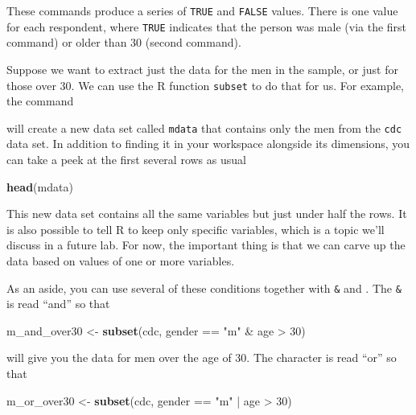 \documentclass[]{article}
\newenvironment{Shaded}{\begin{snugshade}}{\end{snugshade}}
\newcommand{\KeywordTok}[1]{\textcolor[rgb]{0.13,0.29,0.53}{\textbf{{#1}}}}
\newcommand{\DecValTok}[1]{\textcolor[rgb]{0.00,0.00,0.81}{{#1}}}
\newcommand{\StringTok}[1]{\textcolor[rgb]{0.31,0.60,0.02}{{#1}}}
\newcommand{\NormalTok}[1]{{#1}}
\begin{document}
These commands produce a series of \texttt{TRUE} and \texttt{FALSE}
values. There is one value for each respondent, where \texttt{TRUE}
indicates that the person was male (via the first command) or older than
30 (second command).

Suppose we want to extract just the data for the men in the sample, or
just for those over 30. We can use the R function \texttt{subset} to do
that for us. For example, the command

\begin{Shaded}
\end{Shaded}

will create a new data set called \texttt{mdata} that contains only the
men from the \texttt{cdc} data set. In addition to finding it in your
workspace alongside its dimensions, you can take a peek at the first
several rows as usual

\begin{Shaded}
\begin{Highlighting}[]
\KeywordTok{head}\NormalTok{(mdata)}
\end{Highlighting}
\end{Shaded}

This new data set contains all the same variables but just under half
the rows. It is also possible to tell R to keep only specific variables,
which is a topic we'll discuss in a future lab. For now, the important
thing is that we can carve up the data based on values of one or more
variables.

As an aside, you can use several of these conditions together with
\texttt{\&} and \texttt{\textbar{}}. The \texttt{\&} is read ``and'' so
that

\begin{Shaded}
\begin{Highlighting}[]
\NormalTok{m_and_over30 <-}\StringTok{ }\KeywordTok{subset}\NormalTok{(cdc, gender ==}\StringTok{ "m"} \NormalTok{&}\StringTok{ }\NormalTok{age >}\StringTok{ }\DecValTok{30}\NormalTok{)}
\end{Highlighting}
\end{Shaded}

will give you the data for men over the age of 30. The
\texttt{\textbar{}} character is read ``or'' so that

\begin{Shaded}
\begin{Highlighting}[]
\NormalTok{m_or_over30 <-}\StringTok{ }\KeywordTok{subset}\NormalTok{(cdc, gender ==}\StringTok{ "m"} \NormalTok{|}\StringTok{ }\NormalTok{age >}\StringTok{ }\DecValTok{30}\NormalTok{)}
\end{Highlighting}
\end{Shaded}
\end{document}
